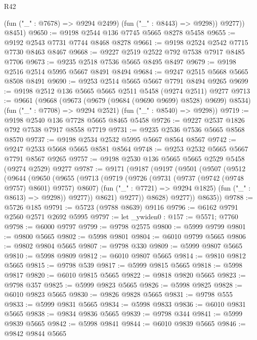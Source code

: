 \begin{lexlean}{R42}
\begin{coremodule}
            (fun ("_" : @7678) => @9294 @2499)
            (fun ("_" : @8443) => @9298))
          @9277))
      @8451)
@9650 := @9198 @2544 @136 @7745 @5665 @8278 @5458
@9655 := @9192 @2543 @7731 @7744 @8468 @8278
@9661 := @9198 @2524 @2542 @7715 @7730 @8463 @8467
@9668 := @9227 @2519 @2522 @792 @7538 @7917 @8485 @7706
@9673 := @9235 @2518 @7536 @5665 @8495 @8497
@9679 := @9198 @2516 @2514 @5995 @5667 @8491 @8494
@9684 := @9247 @2515 @5668 @5665 @8508 @8491
@9690 := @9253 @2514 @5665 @5667 @7791 @8494 @9265
@9699 := @9198 @2512 @136 @5665 @5665 @2511 @5458 (@9274 @2511) @9277
@9713 := @9661
    (@9668
      (@9673 (@9679 (@9684 (@9690 @9699) @8528) @9699) @8534)
      (fun ("_" : @7708) => @9294 @2521)
      (fun ("_" : @8540) => @9298))
@9719 := @9198 @2540 @136 @7728 @5665 @8465 @5458
@9726 := @9227 @2537 @1826 @792 @7538 @7917 @8558 @7719
@9731 := @9235 @2536 @7536 @5665 @8568 @8570
@9737 := @9198 @2534 @2532 @5995 @5667 @8564 @8567
@9742 := @9247 @2533 @5668 @5665 @8581 @8564
@9748 := @9253 @2532 @5665 @5667 @7791 @8567 @9265
@9757 := @9198 @2530 @136 @5665 @5665 @2529 @5458 (@9274 @2529) @9277
@9787 := @9171
    (@9187
      (@9197
        (@9501
          (@9507
            (@9512
              (@9644
                (@9650
                  (@9655
                    (@9713
                      (@9719
                        (@9726
                          (@9731 (@9737 (@9742 (@9748 @9757) @8601) @9757) @8607)
                          (fun ("_" : @7721) => @9294 @1825)
                          (fun ("_" : @8613) => @9298))
                        @9277))
                    @8621)
                  @9277))
              @8628)
            @9277))
        @8635))
@9788 := @5726 @185
@9791 := @5723 (@9788 @8639) @9116
@9796 := @6162 @9791 @2560 @2571 @2692 @5995
@9797 := let _ywiden0 : @157 := @5571; @7760
@9798 := @6000 @9797
@9799 := @9798 @2575
@9800 := @5999 @9799
@9801 := @9800 @5665
@9802 := @5998 @9801
@9804 := @6010 @9799 @5665
@9806 := @9802 @9804 @5665
@9807 := @9798 @330
@9809 := @5999 @9807 @5665
@9810 := @5998 @9809
@9812 := @6010 @9807 @5665
@9814 := @9810 @9812 @5665
@9815 := @9798 @539
@9817 := @5999 @9815 @5665
@9818 := @5998 @9817
@9820 := @6010 @9815 @5665
@9822 := @9818 @9820 @5665
@9823 := @9798 @357
@9825 := @5999 @9823 @5665
@9826 := @5998 @9825
@9828 := @6010 @9823 @5665
@9830 := @9826 @9828 @5665
@9831 := @9798 @555
@9833 := @5999 @9831 @5665
@9834 := @5998 @9833
@9836 := @6010 @9831 @5665
@9838 := @9834 @9836 @5665
@9839 := @9798 @344
@9841 := @5999 @9839 @5665
@9842 := @5998 @9841
@9844 := @6010 @9839 @5665
@9846 := @9842 @9844 @5665

\end{coremodule}
\end{lexlean}
